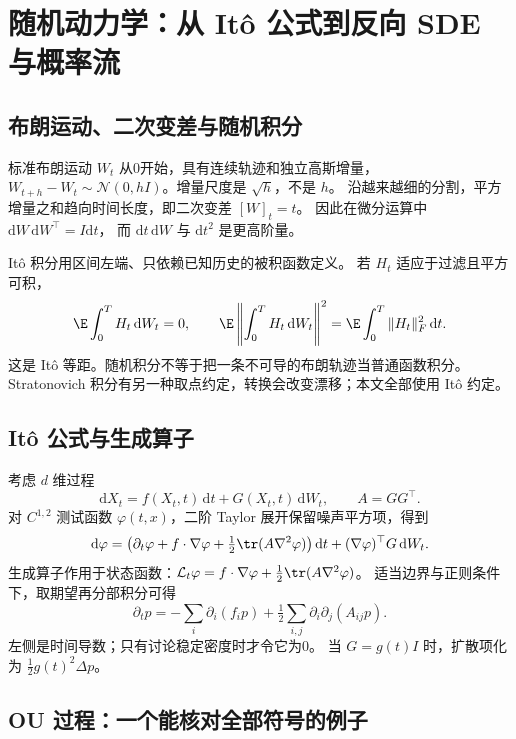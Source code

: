 \chapter{随机动力学：从 Itô 公式到反向 SDE 与概率流}
\label{th:dynamics}

\section{布朗运动、二次变差与随机积分}

标准布朗运动 $W_t$ 从0开始，具有连续轨迹和独立高斯增量，
$W_{t+h}-W_t\sim\mathcal N(0,hI)$。增量尺度是 $\sqrt h$，不是 $h$。
沿越来越细的分割，平方增量之和趋向时间长度，即二次变差 $[W]_t=t$。
因此在微分运算中 $\mathrm dW\,\mathrm dW^\top=I\mathrm dt$，
而 $\mathrm dt\,\mathrm dW$ 与 $\mathrm dt^2$ 是更高阶量。

Itô 积分用区间左端、只依赖已知历史的被积函数定义。
若 $H_t$ 适应于过滤且平方可积，
\[
\E\int_0^T H_t\,\mathrm dW_t=0,\qquad
\E\left\|\int_0^T H_t\,\mathrm dW_t\right\|^2
=\E\int_0^T\|H_t\|_F^2\,\mathrm dt.
\]
这是 Itô 等距。随机积分不等于把一条不可导的布朗轨迹当普通函数积分。
Stratonovich 积分有另一种取点约定，转换会改变漂移；本文全部使用 Itô 约定。

\section{Itô 公式与生成算子}

考虑 $d$ 维过程
\[
\mathrm dX_t=f(X_t,t)\,\mathrm dt+G(X_t,t)\,\mathrm dW_t,
\qquad A=GG^\top.
\]
对 $C^{1,2}$ 测试函数 $\varphi(t,x)$，二阶 Taylor 展开保留噪声平方项，得到
\begin{equation}\label{th:ito}
\mathrm d\varphi=
\left(\partial_t\varphi+f\cdot\nabla\varphi
 +\tfrac12\tr(A\nabla^2\varphi)\right)\mathrm dt
 +(\nabla\varphi)^\top G\,\mathrm dW_t.
\end{equation}
生成算子作用于状态函数：$\mathcal L_t\varphi=f\cdot\nabla\varphi+
\tfrac12\tr(A\nabla^2\varphi)$。
适当边界与正则条件下，取期望再分部积分可得
\begin{equation}\label{th:fpe-general}
\partial_t p=-\sum_i\partial_i(f_ip)
 +\tfrac12\sum_{i,j}\partial_i\partial_j(A_{ij}p).
\end{equation}
左侧是时间导数；只有讨论稳定密度时才令它为0。
当 $G=g(t)I$ 时，扩散项化为 $\tfrac12g(t)^2\Delta p$。

\section{OU 过程：一个能核对全部符号的例子}

